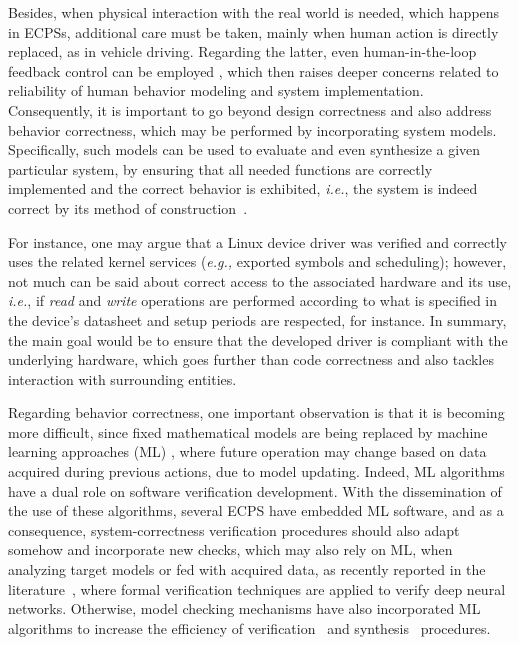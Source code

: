 \documentclass{cta-author}
\begin{document}
Besides, when physical interaction with the real world is needed, which happens in ECPSs, additional care must be taken, mainly when human action is directly replaced, as in vehicle driving. Regarding the latter, even human-in-the-loop feedback control can be employed \cite{munir}, which then raises deeper concerns related to reliability of human behavior modeling and system implementation. Consequently, it is important to go beyond design correctness and also address behavior correctness, which may be performed by incorporating system models. Specifically, such models can be used to evaluate and even synthesize a given particular system, by ensuring that all needed functions are correctly implemented and the correct behavior is exhibited, {\it i.e.}, the system is indeed correct by its method of construction~\cite{Abate17}.

For instance, one may argue that a Linux device driver \cite{ldd} was verified and correctly uses the related kernel services ({\it e.g.,} exported symbols and scheduling); however, not much can be said about correct access to the associated hardware and its use, {\it i.e.}, if \textit{read} and \textit{write} operations are performed according to what is specified in the device's datasheet and setup periods are respected, for instance. In summary, the main goal would be to ensure that the developed driver is compliant with the underlying hardware, which goes further than code correctness and also tackles interaction with surrounding entities.

{\color{blue}
Regarding behavior correctness, one important observation is that it is becoming more difficult, since fixed mathematical models are being replaced by machine learning approaches (ML) \cite{mlembe}, where future operation may change based on data acquired during previous actions, due to model updating. Indeed, ML algorithms have a dual role on software verification development. With the dissemination of the use of these algorithms, several ECPS have embedded ML software, and as a consequence, system-correctness verification procedures should also adapt somehow and incorporate new checks, which may also rely on ML, when analyzing target models or fed with acquired data, as recently reported in the literature~\cite{DBLP:conf/cav/HuangKWW17,DBLP:conf/cav/KatzBDJK17}, where formal verification techniques are applied to verify deep neural networks. Otherwise, model checking mechanisms have also incorporated ML algorithms to increase the efficiency of verification~\cite{BUCCAFURRI199957,Bortolussi2015323,Braazdil201498} and synthesis~\cite{Jha2017693} procedures.
}
\end{document}
